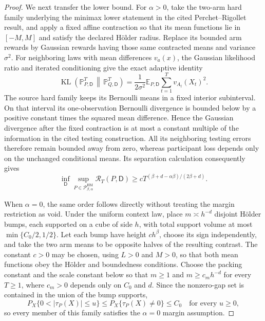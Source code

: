 \documentclass{article}
\begin{document}
\begin{proof}
We next transfer the lower bound.  For \(\alpha>0\), take the two-arm hard family underlying the minimax lower statement in the cited Perchet--Rigollet result, and apply a fixed affine contraction so that its mean functions lie in \([-M,M]\) and satisfy the declared H\"older radius.  Replace its bounded arm rewards by Gaussian rewards having those same contracted means and variance \(\sigma^2\).  For neighboring laws with mean differences \(v_a(x)\), the Gaussian likelihood ratio and iterated conditioning give the exact adaptive identity
\[
 \operatorname{KL}\!\left(
 \mathbb P_{P,\mathsf D}^{T}\,\middle\|\,
 \mathbb P_{Q,\mathsf D}^{T}\right)
 =\frac{1}{2\sigma^2}
 \mathbb E_{P,\mathsf D}\sum_{t=1}^T v_{A_t}(X_t)^2.
\]
The source hard family keeps its Bernoulli means in a fixed interior subinterval.  On that interval its one-observation Bernoulli divergence is bounded below by a positive constant times the squared mean difference.  Hence the Gaussian divergence after the fixed contraction is at most a constant multiple of the information in the cited testing construction.  All its neighboring testing errors therefore remain bounded away from zero, whereas participant loss depends only on the unchanged conditional means.  Its separation calculation consequently gives
\[
 \inf_{\mathsf D}\sup_{P\in\mathcal P_{\beta,\alpha}^{\mathrm{HM}}}
 \mathcal R_T(P,\mathsf D)
 \geq cT^{(\beta+d-\alpha\beta)/(2\beta+d)}.
\]

When \(\alpha=0\), the same order follows directly without treating the margin restriction as void.  Under the uniform context law, place \(m\asymp h^{-d}\) disjoint H\"older bumps, each supported on a cube of side \(h\), with total support volume at most \(\min\{C_0/2,1/2\}\).  Let each bump have height \(ch^\beta\), choose its sign independently, and take the two arm means to be opposite halves of the resulting contrast.  The constant \(c>0\) may be chosen, using \(L>0\) and \(M>0\), so that both mean functions obey the H\"older and boundedness conditions.  Choose the packing constant and the scale constant below so that \(m\geq1\) and \(m\geq c_mh^{-d}\) for every \(T\geq1\), where \(c_m>0\) depends only on \(C_0\) and \(d\).  Since the nonzero-gap set is contained in the union of the bump supports,
\[
 P_X\{0<|\tau_P(X)|\leq u\}
 \leq P_X\{\tau_P(X)\ne0\}\leq C_0
 \quad\text{for every }u\geq0,
\]
so every member of this family satisfies the \(\alpha=0\) margin assumption.


\end{proof}
\end{document}
